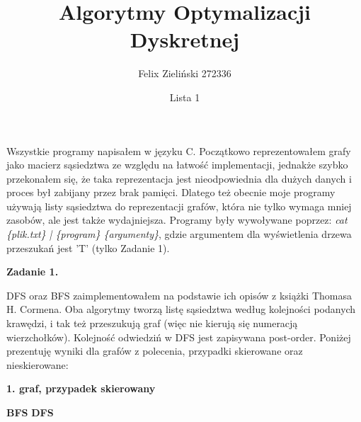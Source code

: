 \documentclass[15pt, a4paper]{article}
\title{Algorytmy Optymalizacji Dyskretnej}
\author{Felix Zieliński 272336}
\date{Lista 1}
\begin{document}
\maketitle
Wszystkie programy napisałem w języku C. Początkowo reprezentowałem grafy jako macierz sąsiedztwa ze względu na łatwość implementacji, jednakże szybko przekonałem się, że taka reprezentacja jest nieodpowiednia dla dużych danych i proces był zabijany przez brak pamięci. Dlatego też obecnie moje programy używają listy sąsiedztwa do reprezentacji grafów, która nie tylko wymaga mniej zasobów, ale jest także wydajniejsza.
Programy były wywoływane poprzez:
\textit{cat \{plik.txt\} | \{program\} \{argumenty\}}, gdzie argumentem dla wyświetlenia drzewa przeszukań jest 'T' (tylko Zadanie 1).

\vspace{0.5cm}

\noindent\hrulefill

\vspace{0.5cm}

\noindent\textbf{Zadanie 1.} 

\noindent DFS oraz BFS zaimplementowałem na podstawie ich opisów z książki Thomasa H. Cormena. Oba algorytmy tworzą listę sąsiedztwa według kolejności podanych krawędzi, i tak też przeszukują graf (więc nie kierują się numeracją wierzchołków). Kolejność odwiedziń w DFS jest zapisywana post-order. Poniżej prezentuję wyniki dla grafów z polecenia, przypadki skierowane oraz nieskierowane:

\vspace{0.5cm}


\begin{center}
    \textbf{1. graf, przypadek skierowany}
\end{center}

\begin{center}
    \textbf{BFS} \hspace{4cm} \textbf{DFS}
\end{center}
\end{document}
